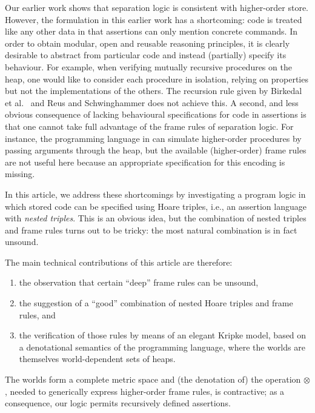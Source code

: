 \documentclass{LMCS}
\theoremstyle{remark}
\begin{document}
Our earlier work \cite{Birkedal:Reus:Schwinghammer:Yang:08,Reus:Schwinghammer:06} shows that separation logic is consistent with higher-order store. However, the formulation in this earlier work has a shortcoming: code is treated like any other data in that  assertions can only mention concrete commands. In order to obtain modular, open and reusable reasoning principles,  it is clearly desirable to abstract from particular code and instead (partially) specify its behaviour. For example, when verifying mutually recursive procedures on the heap, one would like to consider each  procedure in  isolation, relying on properties but not the implementations of the others. The recursion rule given by Birkedal et al.\ \cite{Birkedal:Reus:Schwinghammer:Yang:08} and Reus and Schwinghammer  \cite{Reus:Schwinghammer:06} does not achieve this. 
A second, and less obvious consequence of  lacking  behavioural specifications for code in assertions is that one cannot take full advantage of the frame rules of separation logic. For instance, 
the programming language in \cite{Birkedal:Reus:Schwinghammer:Yang:08} 
can simulate higher-order procedures by passing arguments through the heap, but the available (higher-order) frame rules are not useful here because an appropriate specification for this encoding is missing. 

In this article, we address these shortcomings by investigating a program logic in which stored code can be specified using Hoare triples, i.e., an assertion language with \emph{nested triples}. 
This is an obvious idea, but the combination of nested triples and frame rules turns out to be tricky: the most natural combination is in fact unsound. 

The main technical contributions of this article are therefore: 
\begin{enumerate}[(1)]
\item the observation that certain ``deep'' frame rules can be unsound, 
\item the suggestion of a ``good'' combination of nested Hoare triples and frame rules,  and 
\item the verification of those  rules  by means of   an elegant Kripke model, based on a denotational semantics of the programming language, where the worlds are themselves world-dependent sets of heaps. 
\end{enumerate}
The worlds form a complete metric space and  (the denotation of) the operation $\otimes$, needed to generically express higher-order  frame rules, is contractive; as a consequence, our logic permits recursively defined assertions. 
\end{document}

